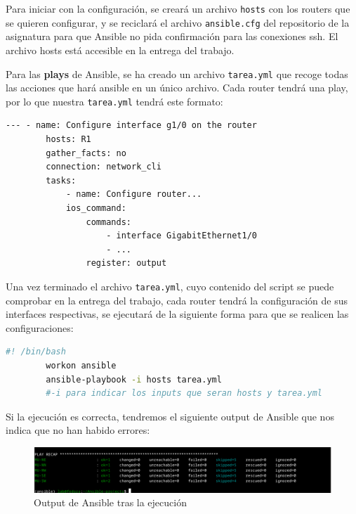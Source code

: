 \documentclass[11pt]{article}
\begin{document}
Para iniciar con la configuración, se creará un archivo \texttt{hosts} con los routers que se quieren configurar, y se reciclará el archivo \texttt{ansible.cfg} del repositorio de la asignatura para que Ansible no pida confirmación para las conexiones ssh. El archivo hosts está accesible en la entrega del trabajo. 

Para las \textbf{plays} de Ansible, se ha creado un archivo \texttt{tarea.yml} que recoge todas las acciones que hará ansible en un único archivo. Cada router tendrá una play, por lo que nuestra \texttt{tarea.yml} tendrá este formato:

\begin{tcolorbox}[
    boxrule=0pt,
    title=Formato que seguirá tarea.yml,
]
    \begin{lstlisting}[gobble=6]
        --- - name: Configure interface g1/0 on the router 
        hosts: R1
        gather_facts: no 
        connection: network_cli 
        tasks:
            - name: Configure router...
            ios_command:
                commands:
                    - interface GigabitEthernet1/0
                    - ... 
                register: output

    \end{lstlisting}
\end{tcolorbox}

Una vez terminado el archivo \texttt{tarea.yml}, cuyo contenido del script se puede comprobar en la entrega del trabajo, cada router tendrá la configuración de sus interfaces respectivas, se ejecutará de la siguiente forma para que se realicen las configuraciones:

\begin{tcolorbox}[
    boxrule=0pt,
    title=Script de ejecución de Ansible,
]
    \begin{lstlisting}[language=bash, gobble=6]
        #! /bin/bash
        workon ansible
        ansible-playbook -i hosts tarea.yml
        #-i para indicar los inputs que seran hosts y tarea.yml
    \end{lstlisting}
\end{tcolorbox}

Si la ejecución es correcta, tendremos el siguiente output de Ansible que nos indica que no han habido errores:

\begin{figure}[h]
    \centering
    \includegraphics[width=\textwidth]{src/ansible.png}
    \caption{Output de Ansible tras la ejecución}
\end{figure}
\end{document}
